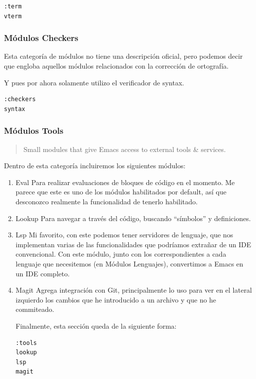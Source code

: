 \documentclass[11pt]{article}
\begin{document}
\begin{verbatim}
:term
vterm

\end{verbatim}
\subsubsection{Módulos Checkers}
\label{sec:org92676ae}

Esta categoría de módulos no tiene una descripción oficial, pero podemos decir que engloba aquellos módulos relacionados con la corrección de ortografía.

Y pues por ahora solamente utilizo el verificador de syntax.

\begin{verbatim}
:checkers
syntax

\end{verbatim}
\subsubsection{Módulos Tools}
\label{sec:orgd5dab5a}

\begin{quote}
Small modules that give Emacs access to external tools \& services.
\end{quote}

Dentro de esta categoría incluiremos los siguientes módulos:
\begin{enumerate}
\item Eval
\label{sec:org6b120c0}
Para realizar evaluaciones de bloques de código en el momento. Me parece que este es uno de los módulos habilitados por default, así que desconozco realmente la funcionalidad de tenerlo habilitado.
\item Lookup
\label{sec:org27b93a2}
Para navegar a través del código, buscando ``símbolos'' y definiciones.
\item Lsp
\label{sec:orgdbf3482}
Mi favorito, con este podemos tener servidores de lenguaje, que nos implementan varias de las funcionalidades que podríamos extrañar de un IDE convencional. Con este módulo, junto con los correspondientes a cada lenguaje que necesitemos (en Módulos Lenguajes), convertimos a Emacs en un IDE completo.
\item Magit
\label{sec:org96bdf37}
Agrega integración con Git, principalmente lo uso para ver en el lateral izquierdo los cambios que he introducido a un archivo y que no he commiteado.

Finalmente, esta sección queda de la siguiente forma:

\begin{verbatim}
:tools
lookup
lsp
magit

\end{verbatim}
\end{enumerate}
\end{document}
